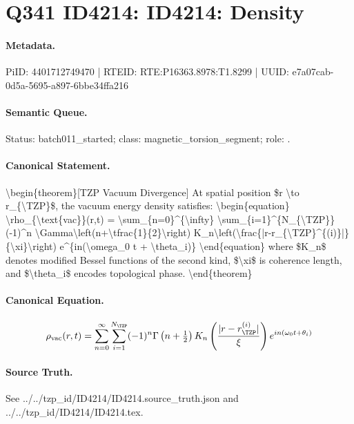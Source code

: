 \section*{Q341 ID4214: ID4214: Density}
\paragraph{Metadata.}
PiID: 4401712749470 | RTEID: RTE:P16363.8978:T1.8299 | UUID: e7a07cab-0d5a-5695-a897-6bbe34ffa216

\paragraph{Semantic Queue.}
Status: batch011\_started; class: magnetic\_torsion\_segment; role: .

\paragraph{Canonical Statement.}
\textbackslash{}begin\{theorem\}[TZP Vacuum Divergence] At spatial position \$r \textbackslash{}to r\_\{\textbackslash{}TZP\}\$, the vacuum energy density satisfies: \textbackslash{}begin\{equation\} \textbackslash{}rho\_\{\textbackslash{}text\{vac\}\}(r,t) = \textbackslash{}sum\_\{n=0\}\textasciicircum{}\{\textbackslash{}infty\} \textbackslash{}sum\_\{i=1\}\textasciicircum{}\{N\_\{\textbackslash{}TZP\}\} (-1)\textasciicircum{}n \textbackslash{}Gamma\textbackslash{}left(n+\textbackslash{}tfrac\{1\}\{2\}\textbackslash{}right) K\_n\textbackslash{}left(\textbackslash{}frac\{|r-r\_\{\textbackslash{}TZP\}\textasciicircum{}\{(i)\}|\}\{\textbackslash{}xi\}\textbackslash{}right) e\textasciicircum{}\{in(\textbackslash{}omega\_0 t + \textbackslash{}theta\_i)\} \textbackslash{}end\{equation\} where \$K\_n\$ denotes modified Bessel functions of the second kind, \$\textbackslash{}xi\$ is coherence length, and \$\textbackslash{}theta\_i\$ encodes topological phase. \textbackslash{}end\{theorem\}

\paragraph{Canonical Equation.}
\[
\begin{equation} \rho_{\text{vac}}(r,t) = \sum_{n=0}^{\infty} \sum_{i=1}^{N_{\TZP}} (-1)^n \Gamma\left(n+\tfrac{1}{2}\right) K_n\left(\frac{|r-r_{\TZP}^{(i)}|}{\xi}\right) e^{in(\omega_0 t + \theta_i)} \end{equation}
\]

\paragraph{Source Truth.}
See ../../tzp\_id/ID4214/ID4214.source\_truth.json and ../../tzp\_id/ID4214/ID4214.tex.

